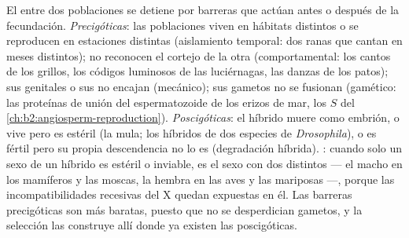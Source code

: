 \begin{proposition}\label{prop:b2:speciation:isolation}
El  entre dos poblaciones se detiene por barreras que actúan
antes o después de la fecundación. \emph{Precigóticas}: las poblaciones
viven en hábitats distintos o se reproducen en estaciones distintas
(aislamiento temporal: dos ranas que cantan en meses distintos); no
reconocen el cortejo de la otra (comportamental: los cantos de los grillos,
los códigos luminosos de las luciérnagas, las danzas de los patos); sus
genitales o sus  no encajan (mecánico); sus gametos no se fusionan
(gamético: las proteínas de unión del espermatozoide de los erizos de mar,
los  $S$ del \cref{ch:b2:angiosperm-reproduction}).
\emph{Poscigóticas}: el híbrido muere como embrión, o vive pero es estéril
(la mula; los híbridos de dos especies de \emph{Drosophila}), o es fértil
pero su propia descendencia no lo es (degradación híbrida).
\emph{}: cuando solo un sexo de un híbrido es estéril o
inviable, es el sexo con dos  distintos --- el macho en
los mamíferos y las moscas, la hembra en las aves y las mariposas ---,
porque las incompatibilidades recesivas del X quedan expuestas en él. Las
barreras precigóticas son más baratas, puesto que no se desperdician
gametos, y la selección las construye allí donde ya existen las
poscigóticas.
\end{proposition}

